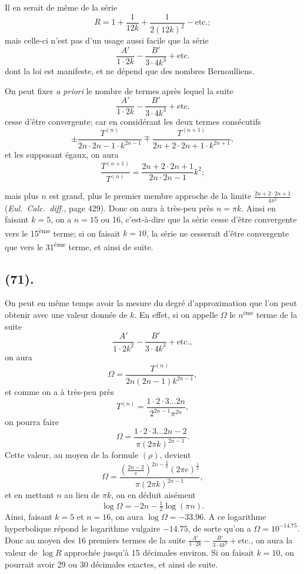 \documentclass{article}
\begin{document}
Il en serait de même de la série
\[ R=1+\frac{1}{12k}+\frac{1}{2(12k)^{2}}-\text{etc.}; \]
mais celle-ci n'est pas d'un usage aussi facile que la série
\[ \frac{A'}{1\cdot2k}-\frac{B'}{3\cdot4k^{3}}+\text{etc.} \]
dont la loi est manifeste, et ne dépend que des nombres Bernoulliens.

On peut fixer \emph{a priori} le nombre de termes après lequel la suite
\[ \frac{A'}{1\cdot2k}-\frac{B'}{3\cdot4k^{3}}+\text{etc.} \]
cesse d'être convergente; car en considérant les deux termes consécutifs
\[ \pm\frac{T^{(n)}}{2n\cdot2n-1\cdot k^{2n-1}}\mp\frac{T^{(n+1)}}{2n+2\cdot2n+1\cdot k^{2n+1}}, \]
et les supposant égaux, on aura
\[ \frac{T^{(n+1)}}{T^{(n)}}=\frac{2n+2\cdot2n+1}{2n\cdot2n-1}k^{2}; \]

mais plus $n$ est grand, plus le premier membre approche de la limite $\frac{2n+2\cdot2n+1}{4\pi^{2}}$ (\emph{Eul.\ Calc.\ diff.}, page 429). Donc on aura à très-peu près $n=\pi k$. Ainsi en faisant $k=5$, on a $n=15$ ou 16, c'est-à-dire que la série cesse d'être convergente vers le 15\textsuperscript{ème} terme; si on faisait $k=10$, la série ne cesserait d'être convergente que vers le 31\textsuperscript{ème} terme, et ainsi de suite.

\subsection*{(71).}

On peut en même temps avoir la mesure du degré d'approximation que l'on peut obtenir avec une valeur donnée de $k$. En effet, si on appelle $\Omega$ le $n^{\text{ème}}$ terme de la suite
\[ \frac{A'}{1\cdot2k^{2}}-\frac{B'}{3\cdot4k^{3}}+\text{etc.}, \]
on aura
\[ \Omega=\frac{T^{(n)}}{2n(2n-1)k^{2n-1}}, \]
et comme on a à très-peu près
\[ T^{(n)}=\frac{1\cdot2\cdot3\ldots2n}{2^{2n-1}\pi^{2n}}, \]
on pourra faire
\[ \Omega=\frac{1\cdot2\cdot3\ldots2n-2}{\pi(2\pi k)^{2n-1}}. \]
Cette valeur, au moyen de la formule $(\rho)$, devient
\[ \Omega=\frac{\left(\frac{2n-2}{e}\right)^{2n-\frac{3}{2}}(2\pi e)^{\frac{1}{2}}}{\pi(2\pi k)^{2n-1}}, \]
et en mettant $n$ au lieu de $\pi k$, on en déduit aisément
\[ \log\Omega=-2n-\tfrac{1}{2}\log(\pi n). \]
Ainsi, faisant $k=5$ et $n=16$, on aura $\log\Omega=-33.96$. A ce logarithme hyperbolique répond le logarithme vulgaire $-14.75$, de sorte qu'on a $\Omega=10^{-14.75}$. Donc au moyen des 16 premiers termes de la suite $\frac{A'}{1\cdot2k}-\frac{B'}{3\cdot4k^{3}}+\text{etc.}$, on aura la valeur de $\log R$ approchée jusqu'à 15 décimales environ. Si on faisait $k=10$, on pourrait avoir 29 ou 30 décimales exactes, et ainsi de suite.
\end{document}
